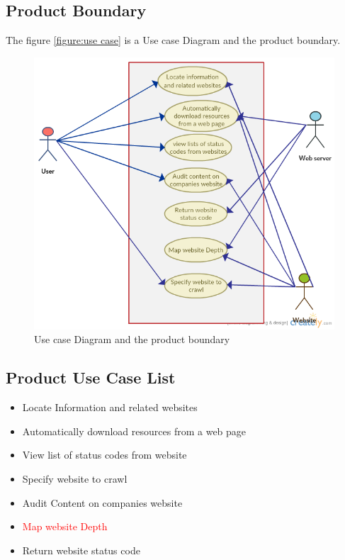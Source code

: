 \documentclass[titlepage]{article}
\begin{document}
\subsection*{Product Boundary}
The figure \ref{figure:use case} is a Use case Diagram and the product boundary.
\begin{figure}[H]
  \caption{Use case Diagram and the product boundary}
  \centering
    \includegraphics[scale=0.75]{pylinkvalidator_Use_Case_Diagram_copy}
\end{figure}
\lipsum[8]
\label{figure:use case}

\subsection*{Product Use Case List  }
\begin{itemize}
  \item Locate Information and related websites
  \item Automatically download resources from a web page
  \item View list of status codes from website 
  \item Specify website to crawl
  \item Audit Content on companies website 
  \item \textcolor{red}{Map website Depth}
  \item Return website status code
\end{itemize}
\end{document}
